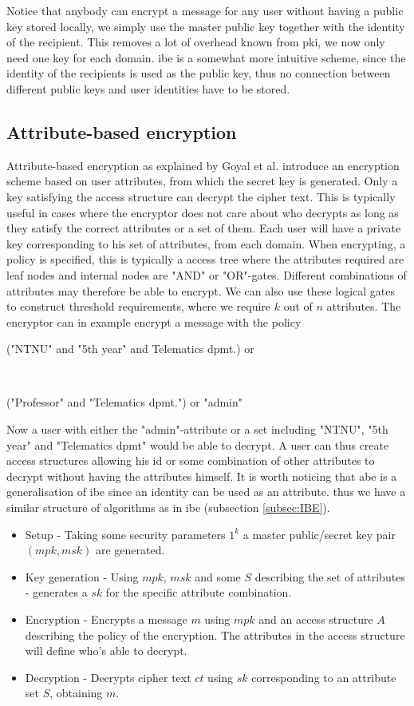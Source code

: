 Notice that anybody can encrypt a message for any user without having a public key stored locally, we simply use the master public key together with the identity of the recipient. This removes a lot of overhead known from \gls{pki}, we now only need one key for each domain. \Gls{ibe} is a somewhat more intuitive scheme, since the identity of the recipients is used as the public key, thus no connection between different public keys and user identities have to be stored.

\subsection{Attribute-based encryption}\label{subsec:ABE}

Attribute-based encryption as explained by Goyal et al. \cite{ABE} introduce an encryption scheme based on user attributes, from which the secret key is generated. Only a key satisfying the access structure can decrypt the cipher text. This is typically useful in cases where the encryptor does not care about who decrypts as long as they satisfy the correct attributes or a set of them. Each user will have a private key corresponding to his set of attributes, from each domain. When encrypting, a policy is specified, this is typically a access tree where the attributes required are leaf nodes and internal nodes are "AND" or "OR"-gates. Different combinations of attributes may therefore be able to encrypt. We can also use these logical gates to construct threshold requirements, where we require $k$ out of $n$ attributes. The encryptor can in example encrypt a message with the policy\\ \centerline{("NTNU" and "5th year" and Telematics dpmt.) or} \\ \centerline{("Professor" and "Telematics dpmt.") or "admin"}
Now a user with either the "admin"-attribute or a set including "NTNU", "5th year" and "Telematics dpmt" would be able to decrypt. A user can thus create access structures allowing his id or some combination of other attributes to decrypt without having the attributes himself. It is worth noticing that \gls{abe} is a generalisation of \gls{ibe} since an identity can be used as an attribute. thus we have a similar structure of algorithms as in \gls{ibe} (subsection \ref{subsec:IBE}).

\begin{itemize}
\item Setup - Taking some security parameters $1^k$ a master public/secret key pair $(mpk, msk)$ are generated.
\item Key generation - Using $mpk$, $msk$ and some $S$ describing the set of attributes - generates a $sk$ for the specific attribute combination. 
\item Encryption - Encrypts a message $m$ using $mpk$ and an access structure $A$ describing the policy of the encryption. The attributes in the access structure will define who's able to decrypt. 
\item Decryption - Decrypts cipher text $ct$ using $sk$ corresponding to an attribute set $S$, obtaining $m$. 
\end{itemize}


